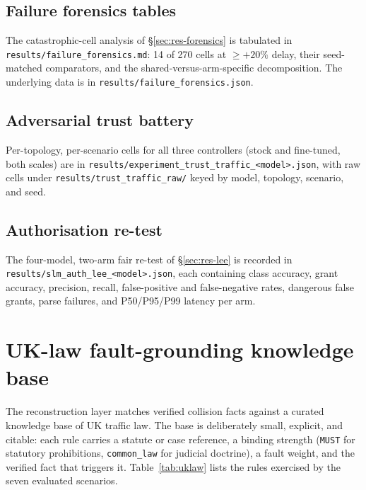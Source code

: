 \subsection{Failure forensics tables}
The catastrophic-cell analysis of \S\ref{sec:res-forensics} is tabulated
in \texttt{results/failure\_forensics.md}: 14 of 270 cells at
$\ge{+}20\%$ delay, their seed-matched comparators, and the
shared-versus-arm-specific decomposition. The underlying data is in
\texttt{results/failure\_forensics.json}.

\subsection{Adversarial trust battery}
Per-topology, per-scenario cells for all three controllers (stock and
fine-tuned, both scales) are in
\texttt{results/\allowbreak experiment\_\allowbreak trust\_\allowbreak traffic\_\allowbreak <model>.json}, with raw cells
under \texttt{results/trust\_traffic\_raw/} keyed by model, topology,
scenario, and seed.

\subsection{Authorisation re-test}
The four-model, two-arm fair re-test of \S\ref{sec:res-lee} is recorded in
\texttt{results/slm\_auth\_lee\_<model>.json}, each containing class
accuracy, grant accuracy, precision, recall, false-positive and
false-negative rates, dangerous false grants, parse failures, and
P50/P95/P99 latency per arm.





\section{UK-law fault-grounding knowledge base}\label{app:uklaw}

The reconstruction layer matches verified collision facts against a
curated knowledge base of UK traffic law. The base is deliberately small,
explicit, and citable: each rule carries a statute or case reference, a
binding strength (\texttt{MUST} for statutory prohibitions,
\texttt{common\_law} for judicial doctrine), a fault weight, and the
verified fact that triggers it. Table~\ref{tab:uklaw} lists the rules
exercised by the seven evaluated scenarios.

